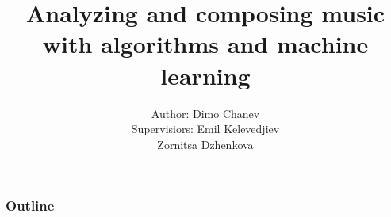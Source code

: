 \documentclass[12pt]{beamer}
\begin{document}
	\author[Dimo Chanev]{
		\begin{table}[]
			\begin{tabular}{rl}
				\normalsize{Author:       } & \normalsize{Dimo Chanev} \\
				\scriptsize{Supervisiors: } & \scriptsize{Emil Kelevedjiev} \\
											& \scriptsize{Zornitsa Dzhenkova}
			\end{tabular}
		\end{table}
	}
	\title[Algorithms and music]{\textbf{Analyzing and composing music with algorithms and machine learning}}
	
	\begin{frame}
		\titlepage
    \end{frame}
    \begin{frame}
        \frametitle{Outline}
        \tableofcontents
    \end{frame}        
\end{document}
